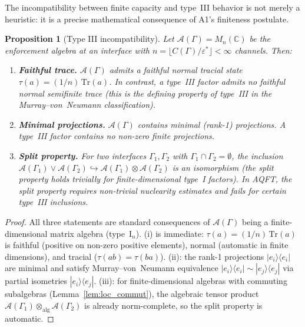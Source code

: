 \documentclass[11pt,a4paper]{article}
\newtheorem{proposition}[theorem]{Proposition}
\theoremstyle{definition}
\newcommand{\eps}{\varepsilon}
\begin{document}
The incompatibility between finite capacity and type~III behavior is
not merely a heuristic: it is a precise mathematical consequence of
A1's finiteness postulate.

\begin{proposition}[Type III incompatibility]\label{prop:typeIII_incompat}
Let $\mathcal{A}(\Gamma) = M_n(\mathbb{C})$ be the enforcement algebra
at an interface with $n = \lfloor C(\Gamma)/\eps^* \rfloor < \infty$
channels.  Then:
\begin{enumerate}[label=(\roman*),nosep]
  \item \textbf{Faithful trace.}\quad
  $\mathcal{A}(\Gamma)$ admits a faithful normal tracial state
  $\tau(a) = (1/n)\,\mathrm{Tr}(a)$.  In contrast, a type~III factor
  admits no faithful normal semifinite trace (this is the defining
  property of type~III in the Murray--von~Neumann classification).
  \item \textbf{Minimal projections.}\quad
  $\mathcal{A}(\Gamma)$ contains minimal (rank-1) projections.
  A type~III factor contains no non-zero finite projections.
  \item \textbf{Split property.}\quad
  For two interfaces $\Gamma_1, \Gamma_2$ with
  $\Gamma_1 \cap \Gamma_2 = \emptyset$, the inclusion
  $\mathcal{A}(\Gamma_1) \vee \mathcal{A}(\Gamma_2)
  \hookrightarrow \mathcal{A}(\Gamma_1) \otimes \mathcal{A}(\Gamma_2)$
  is an isomorphism (the split property holds trivially for
  finite-dimensional type~I factors).  In AQFT, the split property
  requires non-trivial nuclearity estimates and fails for
  certain type~III inclusions.
\end{enumerate}
\end{proposition}

\begin{proof}
All three statements are standard consequences of $\mathcal{A}(\Gamma)$
being a finite-dimensional matrix algebra (type~I$_n$).  (i) is
immediate: $\tau(a) = (1/n)\,\mathrm{Tr}(a)$ is faithful (positive on
non-zero positive elements), normal (automatic in finite dimensions),
and tracial ($\tau(ab) = \tau(ba)$).  (ii): the rank-1 projections
$|e_i\rangle\langle e_i|$ are minimal and satisfy Murray--von~Neumann
equivalence $|e_i\rangle\langle e_i| \sim |e_j\rangle\langle e_j|$ via
partial isometries $|e_i\rangle\langle e_j|$.  (iii): for
finite-dimensional algebras with commuting subalgebras
(Lemma~\ref{lem:loc_commut}), the algebraic tensor product
$\mathcal{A}(\Gamma_1) \otimes_{\mathrm{alg}} \mathcal{A}(\Gamma_2)$
is already norm-complete, so the split property is automatic.
\end{proof}
\end{document}
